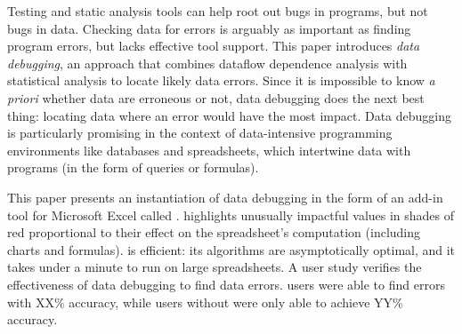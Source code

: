 Testing and static analysis tools can help root out bugs in programs,
but not bugs in data. Checking data for errors is arguably as
important as finding program errors, but lacks effective tool
support. This paper introduces \emph{data debugging}, an approach that
combines dataflow dependence analysis with statistical analysis to
locate likely data errors. Since it is impossible to know \emph{a
priori} whether data are erroneous or not, data debugging does the
next best thing: locating data where an error would have the most
impact. Data debugging is particularly promising in the context of
data-intensive programming environments like databases and
spreadsheets, which intertwine data with programs (in the form of
queries or formulas).

This paper presents an instantiation of data debugging in the form of an add-in
tool for Microsoft Excel called \checkcell{}. \checkcell{} highlights
unusually impactful values in shades of red proportional to their
effect on the spreadsheet's computation (including charts and 
formulas). \checkcell{} is efficient: its algorithms are asymptotically
optimal, and it takes under a minute to run on large spreadsheets. A
user study verifies the effectiveness of data debugging to find
data errors. \checkcell{} users were able to find errors with XX\%
accuracy, while users without were only able to achieve YY\% accuracy.
